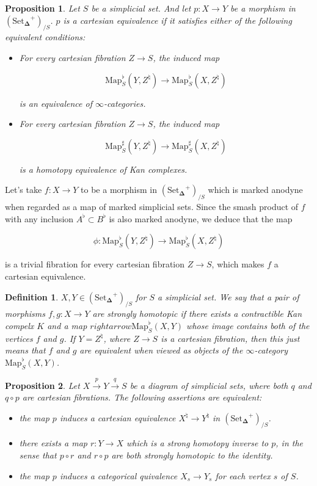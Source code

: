 \documentclass[12pt]{amsart}
\newcommand{\8}{\ensuremath{\infty}}
\newcommand{\SSet}{\ensuremath{\text{Set}_{\boldsymbol{\Delta}}}}
\newcommand{\Map}{\ensuremath{\text{Map}}}
\newtheorem{definition}{Definition}
\newtheorem{proposition}{Proposition}
\begin{document}
\begin{proposition}
  Let $S$ be a simplicial set. And let $p: X \rightarrow Y$ be a morphism in $(\SSet^+)_{/S}$. $p$ is a cartesian equivalence if it satisfies either of the following equivalent conditions:
  \begin{itemize}
    \item[(1)] For every cartesian fibration $Z \rightarrow S$, the induced map

          $$
            \Map^\flat_S(Y, Z^\natural) \rightarrow \Map_S^\flat(X, Z^\natural)
          $$

          is an equivalence of \8-categories.
    \item[(2)] For every cartesian fibration $Z \rightarrow S$, the induced map

          $$
            \Map^\sharp_S(Y, Z^\natural) \rightarrow \Map_S^\sharp(X, Z^\natural)
          $$

          is a homotopy equivalence of Kan complexes.
  \end{itemize}
\end{proposition}

Let's take $f: X \rightarrow Y$ to be a morphism in $(\SSet^+)_{/S}$ which is marked anodyne when regarded as a map of marked simplicial sets. Since the smash product of $f$ with any inclusion $A^\flat\subset B^\flat$ is also marked anodyne, we deduce that the map

$$
  \phi: \Map_S^\flat(Y, Z^\natural) \rightarrow \Map_S^\flat(X, Z^\natural)
$$

is a trivial fibration for every cartesian fibration $Z \rightarrow S$, which makes $f$ a cartesian equivalence.

\begin{definition}
  $X, Y \in (\SSet^+)_{/S}$ for $S$ a simplicial set. We say that a pair of morphisms $f, g: X \rightarrow Y$ are strongly homotopic if there exists a contractible Kan compelx $K$ and a map $rightarrow \Map^\flat_S(X, Y)$ whose image contains both of the vertices $f$ and $g$. If $Y = Z^\natural$, where $Z \rightarrow S$ is a cartesian fibration, then this just means that $f$ and $g$ are equivalent when viewed as objects of the \8-category $\Map_S^\flat(X, Y)$.
\end{definition}

\begin{proposition}
  Let $X \xrightarrow{p} Y \xrightarrow{q} S$ be a diagram of simplicial sets, where both $q$ and $q\circ p$ are cartesian fibrations. The following assertions are equivalent:
  \begin{itemize}
    \item[(1)] the map $p$ induces a cartesian equivalence $X^\natural \rightarrow Y^\natural$ in $(\SSet^+)_{/S}$.
    \item[(2)] there exists a map $r: Y \rightarrow X$ which is a strong homotopy inverse to $p$, in the sense that $p\circ r$ and $r\circ p$ are both strongly homotopic to the identity.
    \item[(3)] the map $p$ induces a categorical quivalence $X_s \rightarrow Y_s$ for each vertex $s$ of $S$.
  \end{itemize}
\end{proposition}
\end{document}
